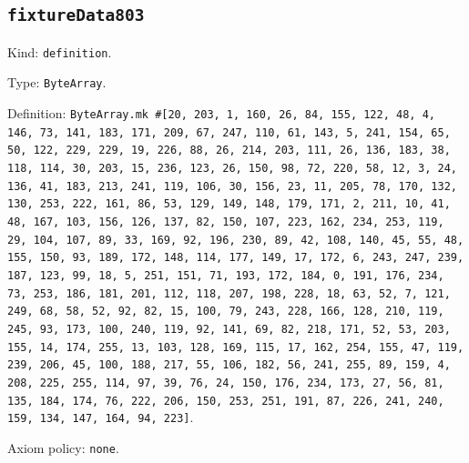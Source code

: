 \documentclass[11pt]{article}
\begin{document}
\subsection*{\texttt{fixtureData803}}
\noindent Kind: \texttt{definition}.\par
\noindent Type: \texttt{ByteArray}.\par
\noindent Definition: \texttt{ByteArray.mk \#[20, 203, 1, 160, 26, 84, 155, 122, 48, 4, 146, 73, 141, 183, 171, 209, 67, 247, 110, 61, 143, 5, 241, 154, 65, 50, 122, 229, 229, 19, 226, 88, 26, 214, 203, 111, 26, 136, 183, 38, 118, 114, 30, 203, 15, 236, 123, 26, 150, 98, 72, 220, 58, 12, 3, 24, 136, 41, 183, 213, 241, 119, 106, 30, 156, 23, 11, 205, 78, 170, 132, 130, 253, 222, 161, 86, 53, 129, 149, 148, 179, 171, 2, 211, 10, 41, 48, 167, 103, 156, 126, 137, 82, 150, 107, 223, 162, 234, 253, 119, 29, 104, 107, 89, 33, 169, 92, 196, 230, 89, 42, 108, 140, 45, 55, 48, 155, 150, 93, 189, 172, 148, 114, 177, 149, 17, 172, 6, 243, 247, 239, 187, 123, 99, 18, 5, 251, 151, 71, 193, 172, 184, 0, 191, 176, 234, 73, 253, 186, 181, 201, 112, 118, 207, 198, 228, 18, 63, 52, 7, 121, 249, 68, 58, 52, 92, 82, 15, 100, 79, 243, 228, 166, 128, 210, 119, 245, 93, 173, 100, 240, 119, 92, 141, 69, 82, 218, 171, 52, 53, 203, 155, 14, 174, 255, 13, 103, 128, 169, 115, 17, 162, 254, 155, 47, 119, 239, 206, 45, 100, 188, 217, 55, 106, 182, 56, 241, 255, 89, 159, 4, 208, 225, 255, 114, 97, 39, 76, 24, 150, 176, 234, 173, 27, 56, 81, 135, 184, 174, 76, 222, 206, 150, 253, 251, 191, 87, 226, 241, 240, 159, 134, 147, 164, 94, 223]}.\par
\noindent Axiom policy: \texttt{none}.\par
\end{document}
